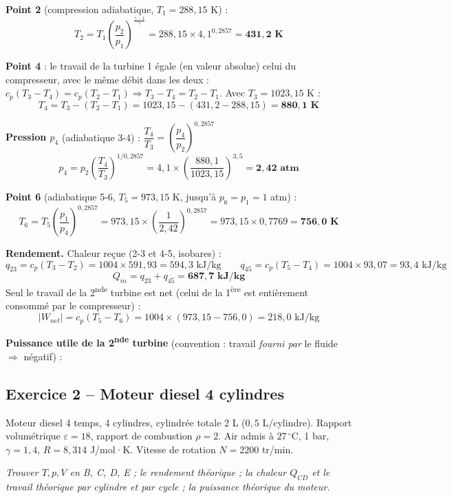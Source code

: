 \begin{correction}
\textbf{Point 2} (compression adiabatique, $T_1=288{,}15$ K) :
\[T_2=T_1\left(\frac{p_2}{p_1}\right)^{\frac{\gamma-1}{\gamma}}=288{,}15\times4{,}1^{0{,}2857}
=\mathbf{431{,}2\text{ K}}\]

\textbf{Point 4} : le travail de la turbine 1 égale (en valeur absolue) celui du compresseur, avec le même
débit dans les deux : $c_p(T_3-T_4)=c_p(T_2-T_1)\Rightarrow T_3-T_4=T_2-T_1$.
Avec $T_3=1023{,}15$ K :
\[T_4=T_3-(T_2-T_1)=1023{,}15-(431{,}2-288{,}15)=\mathbf{880{,}1\text{ K}}\]

\textbf{Pression $p_4$} (adiabatique 3-4) : $\dfrac{T_4}{T_3}=\left(\dfrac{p_4}{p_2}\right)^{0{,}2857}$
\[p_4=p_2\left(\frac{T_4}{T_3}\right)^{1/0{,}2857}=4{,}1\times\left(\frac{880{,}1}{1023{,}15}\right)^{3{,}5}
=\mathbf{2{,}42\text{ atm}}\]

\textbf{Point 6} (adiabatique 5-6, $T_5=973{,}15$ K, jusqu'à $p_6=p_1=1$ atm) :
\[T_6=T_5\left(\frac{p_1}{p_4}\right)^{0{,}2857}=973{,}15\times\left(\frac{1}{2{,}42}\right)^{0{,}2857}
=973{,}15\times0{,}7769=\mathbf{756{,}0\text{ K}}\]

\textbf{Rendement.} Chaleur reçue (2-3 et 4-5, isobares) :
\[q_{23}=c_p(T_3-T_2)=1004\times591{,}93=594{,}3\text{ kJ/kg}\qquad
q_{45}=c_p(T_5-T_4)=1004\times93{,}07=93{,}4\text{ kJ/kg}\]
\[Q_{in}=q_{23}+q_{45}=\mathbf{687{,}7\text{ kJ/kg}}\]
Seul le travail de la 2\textsuperscript{nde} turbine est net (celui de la 1\textsuperscript{ère} est
entièrement consommé par le compresseur) :
\[|W_{net}|=c_p(T_5-T_6)=1004\times(973{,}15-756{,}0)=218{,}0\text{ kJ/kg}\]

\textbf{Puissance utile de la 2\textsuperscript{nde} turbine} (convention : travail \emph{fourni par} le
fluide $\Rightarrow$ négatif) :
\end{correction}

\subsection{Exercice 2 -- Moteur diesel 4 cylindres}

\begin{enonce}
Moteur diesel 4 temps, 4 cylindres, cylindrée totale 2 L ($0{,}5$ L/cylindre). Rapport volumétrique
$\varepsilon=18$, rapport de combustion $\rho=2$. Air admis à $27\,^\circ$C, 1 bar, $\gamma=1{,}4$,
$R=8{,}314$ J/mol·K. Vitesse de rotation $N=2200$ tr/min.

\emph{Trouver $T,p,V$ en B, C, D, E ; le rendement théorique ; la chaleur $Q_{CD}$ et le travail théorique
par cylindre et par cycle ; la puissance théorique du moteur.}
\end{enonce}


